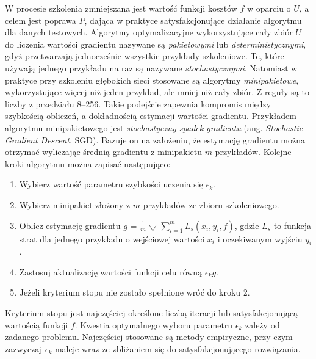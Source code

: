 W procesie szkolenia zmniejszana jest wartość funkcji kosztów $f$ w oparciu \linebreak o $U$, a celem jest poprawa $P$, dająca w praktyce satysfakcjonujące działanie algorytmu dla danych testowych. Algorytmy optymalizacyjne wykorzystujące cały zbiór $U$ do liczenia wartości gradientu nazywane są \textit{pakietowymi} lub \textit{deterministycznymi}, gdyż przetwarzają jednocześnie wszystkie przykłady szkoleniowe. Te, które używają jednego przykładu na raz są nazywane \textit{stochastycznymi}. Natomiast \linebreak w praktyce przy szkoleniu głębokich sieci stosowane są algorytmy \textit{minipakietowe}, wykorzystujące więcej niż jeden przykład, ale mniej niż cały zbiór. Z reguły są to liczby \linebreak z przedziału 8--256. Takie podejście zapewnia kompromis między szybkością obliczeń, a dokładnością estymacji wartości gradientu.
\newpage
Przykładem algorytmu minipakietowego jest \textit{stochastyczny spadek gradientu} (ang. \textit{Stochastic Gradient Descent}, SGD). Bazuje on na założeniu, że estymację gradientu można otrzymać wyliczając średnią gradientu z minipakietu $m$ przykładów. Kolejne kroki algorytmu można zapisać następująco:
\begin{enumerate}
	\item Wybierz wartość parametru szybkości uczenia się $\epsilon_k$.
	\item Wybierz minipakiet złożony z $m$ przykładów ze zbioru szkoleniowego.
	\item Oblicz estymację gradientu $g$ = $\frac{1}{m}\bigtriangledown \sum_{i=1}^{m}L_s(x_i, y_i, f)$, gdzie $L_s$ to funkcja strat dla jednego przykładu o wejściowej wartości $x_i$ i oczekiwanym wyjściu $y_i$.
	\item Zastosuj aktualizację wartości funkcji celu równą $\epsilon_k g$.
	\item Jeżeli kryterium stopu nie zostało spełnione wróć do kroku 2. 
\end{enumerate}

Kryterium stopu jest najczęściej określone liczbą iteracji lub satysfakcjonującą wartością funkcji $f$. Kwestia optymalnego wyboru parametru $\epsilon_k$ zależy od zadanego problemu. Najczęściej stosowane są metody empiryczne, przy czym zazwyczaj $\epsilon_k$ maleje wraz ze zbliżaniem się do satysfakcjonującego rozwiązania.


